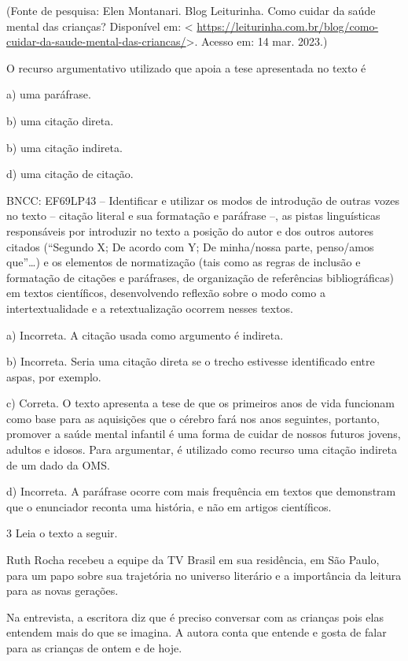 (Fonte de pesquisa: Elen Montanari. Blog Leiturinha. Como cuidar da
saúde mental das crianças? Disponível em: \textless{}
\url{https://leiturinha.com.br/blog/como-cuidar-da-saude-mental-das-criancas/}\textgreater.
Acesso em: 14 mar. 2023.)

O recurso argumentativo utilizado que apoia a tese apresentada no texto
é

a) uma paráfrase.

b) uma citação direta.

b) uma citação indireta.

d) uma citação de citação.

BNCC: EF69LP43 -- Identificar e utilizar os modos de introdução de
outras vozes no texto -- citação literal e sua formatação e paráfrase
--, as pistas linguísticas responsáveis por introduzir no texto a
posição do autor e dos outros autores citados (``Segundo X; De acordo
com Y; De minha/nossa parte, penso/amos que''\ldots) e os elementos de
normatização (tais como as regras de inclusão e formatação de citações e
paráfrases, de organização de referências bibliográficas) em textos
científicos, desenvolvendo reflexão sobre o modo como a
intertextualidade e a retextualização ocorrem nesses textos.

a) Incorreta. A citação usada como argumento é indireta.

b) Incorreta. Seria uma citação direta se o trecho estivesse
identificado entre aspas, por exemplo.

c) Correta. O texto apresenta a tese de que os primeiros anos de vida
funcionam como base para as aquisições que o cérebro fará nos anos
seguintes, portanto, promover a saúde mental infantil é uma forma de
cuidar de nossos futuros jovens, adultos e idosos. Para argumentar, é
utilizado como recurso uma citação indireta de um dado da OMS.

d) Incorreta. A paráfrase ocorre com mais frequência em textos que
demonstram que o enunciador reconta uma história, e não em artigos
científicos.

\num{3} Leia o texto a seguir.

Ruth Rocha recebeu a equipe da TV Brasil em sua residência, em São
Paulo, para um papo sobre sua trajetória no universo literário e a
importância da leitura para as novas gerações.

Na entrevista, a escritora diz que é preciso conversar com as crianças
pois elas entendem mais do que se imagina. A autora conta que entende e
gosta de falar para as crianças de ontem e de hoje.

